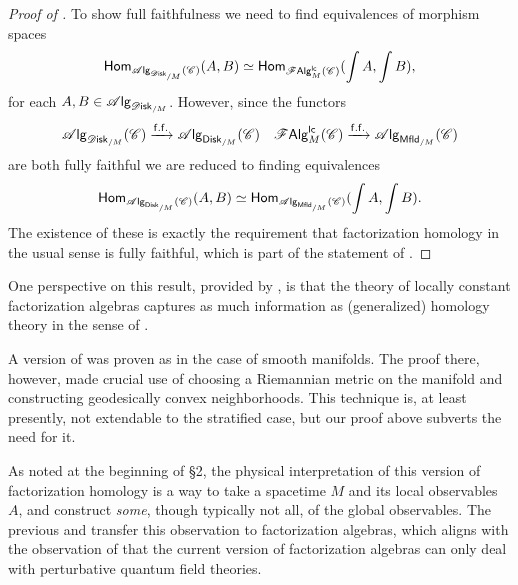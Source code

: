 \documentclass[../text.tex]{subfiles}
\begin{document}
\begin{proof}[Proof of {}]
    To show full faithfulness we need to find equivalences of morphism spaces
    \begin{equation}
        \mathsf{Hom}_{\alg{\disk_{/M}} (\catC)} (A, B) \simeq \mathsf{Hom}_{\lcfa_M (\catC)} (\int A, \int B),
    \end{equation}
    for each $A, B \in \alg{\disk_{/M}}$. However, since the functors
    \begin{align}
        &\alg{\disk_{/M}} (\catC) \xrightarrow{\mathsf{f.f.}} \alg{\disk[r]_{/M}} (\catC) &\lcfa_M (\catC) \xrightarrow{\mathsf{f.f.}} \alg{\mfld[r]_{/M}} (\catC)
    \end{align}
    are both fully faithful we are reduced to finding equivalences
    \begin{equation}
        \mathsf{Hom}_{\alg{\disk[r]_{/M}} (\catC)} (A, B) \simeq \mathsf{Hom}_{\alg{\mfld[r]_{/M}} (\catC)} (\int A, \int B).
    \end{equation}
    The existence of these is exactly the requirement that factorization homology in the usual sense is fully faithful, which is part of the statement of \cite[lem.2.17]{aft_fhstrat}.
\end{proof}

\begin{remark}
    One perspective on this result, provided by \cite[thm.2.43]{aft_fhstrat}, is that the theory of locally constant factorization algebras captures as much information as (generalized) homology theory in the sense of \cite[def.2.37]{aft_fhstrat}.
\end{remark}

\begin{remark}
    A version of  was proven as \cite[thm.6]{gtz2014} in the case of smooth manifolds. The proof there, however, made crucial use of choosing a Riemannian metric on the manifold and constructing geodesically convex neighborhoods. This technique is, at least presently, not extendable to the stratified case, but our proof above subverts the need for it. 
\end{remark}

\begin{remark}
    As noted at the beginning of \S2, the physical interpretation of this version of factorization homology is a way to take a spacetime $M$ and its local observables $A$, and construct \emph{some}, though typically not all, of the global observables. The previous  and  transfer this observation to factorization algebras, which aligns with the observation of \cite{cg2016} that the current version of factorization algebras can only deal with perturbative quantum field theories. 
\end{remark}
\end{document}
